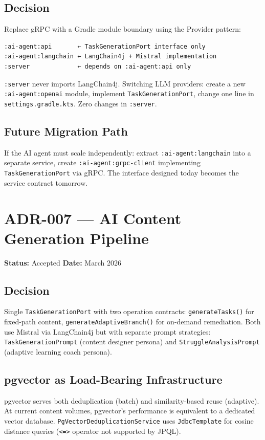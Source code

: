 \subsection*{Decision}
Replace gRPC with a Gradle module boundary using the Provider pattern:

\begin{verbatim}
:ai-agent:api       ← TaskGenerationPort interface only
:ai-agent:langchain ← LangChain4j + Mistral implementation
:server             ← depends on :ai-agent:api only
\end{verbatim}

\texttt{:server} never imports LangChain4j. Switching LLM providers: create a new \texttt{:ai-agent:openai} module, implement \texttt{TaskGenerationPort}, change one line in \texttt{settings.gradle.kts}. Zero changes in \texttt{:server}.

\subsection*{Future Migration Path}
If the AI agent must scale independently: extract \texttt{:ai-agent:langchain} into a separate service, create \texttt{:ai-agent:grpc-client} implementing \texttt{TaskGenerationPort} via gRPC. The interface designed today becomes the service contract tomorrow.

\section{ADR-007 — AI Content Generation Pipeline}
\label{adr:007}
\textbf{Status:} Accepted \quad \textbf{Date:} March 2026

\subsection*{Decision}
Single \texttt{TaskGenerationPort} with two operation contracts: \texttt{generateTasks()} for fixed-path content, \texttt{generateAdaptiveBranch()} for on-demand remediation. Both use Mistral via LangChain4j but with separate prompt strategies: \texttt{TaskGenerationPrompt} (content designer persona) and \texttt{StruggleAnalysisPrompt} (adaptive learning coach persona).

\subsection*{pgvector as Load-Bearing Infrastructure}
pgvector serves both deduplication (batch) and similarity-based reuse (adaptive). At current content volumes, pgvector's performance is equivalent to a dedicated vector database. \texttt{PgVectorDeduplicationService} uses \texttt{JdbcTemplate} for cosine distance queries (\texttt{<=>} operator not supported by JPQL).

